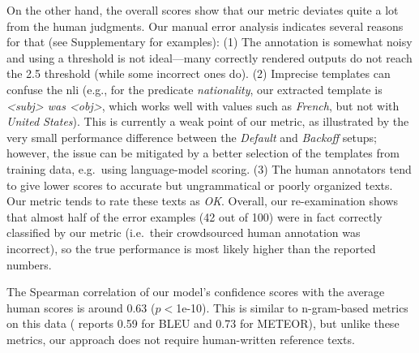 %
%
%
%
On the other hand, the overall scores show that our metric deviates quite a lot from the human judgments. Our manual error analysis indicates several reasons for that (see Supplementary for examples): (1) The annotation is somewhat noisy and using a threshold is not ideal---many correctly rendered outputs do not reach the 2.5 threshold (while some incorrect ones do). (2) Imprecise templates can confuse the \ac{nli}
(e.g., for the predicate \emph{nationality}, our extracted template is \emph{\textless{}subj\textgreater{} was \textless{}obj\textgreater{}}, which works well with values such as \emph{French}, but not with \emph{United States}). This is currently a weak point of our metric, as illustrated by the very small performance difference between the \emph{Default} and \emph{Backoff} setups; however, the issue can be mitigated by a better selection of the templates from training data, e.g.\ using language-model scoring.
(3) The human annotators tend to give lower scores to accurate but ungrammatical or poorly organized texts. Our metric tends to rate these texts as \emph{OK}.
Overall, our re-examination shows that almost half of the error examples (42 out of 100) were in fact correctly classified by our metric (i.e.\ their crowdsourced human annotation was incorrect), %
so the true performance is most likely higher than the reported numbers. %

The Spearman correlation of our model's confidence scores with the average human scores is around 0.63 ($p<$1e-10). This is similar to n-gram-based metrics on this data (\citealp{shimorina_human_2018} reports 0.59 for BLEU and 0.73 for METEOR), but unlike these metrics, our approach does not require human-written reference texts.



